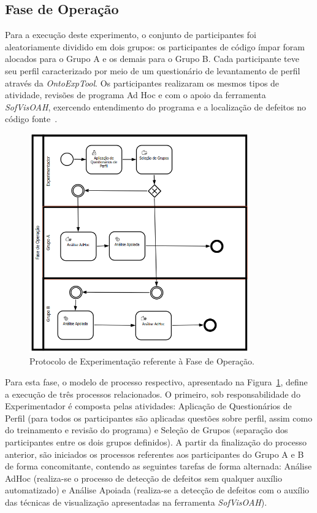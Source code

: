 \subsection{Fase de Operação}
Para a execução deste experimento, o conjunto de participantes foi aleatoriamente dividido em dois grupos: os participantes de código ímpar foram alocados para o Grupo A e os demais para o Grupo B. Cada participante teve seu perfil caracterizado por meio de um questionário de levantamento de perfil através da \textit{OntoExpTool}. Os participantes realizaram os mesmos tipos de atividade, revisões de programa Ad Hoc e com o apoio da ferramenta \textit{SofVisOAH}, exercendo entendimento do programa e a localização de defeitos no código fonte~\cite{d2012avaliaccao}.

\begin{figure}[!htb]
\centering
\includegraphics[width=0.85\textwidth]{images/protocolo-operacao.png}
\caption{Protocolo de Experimentação referente à Fase de Operação.}
\label{img:protocolo-operacao}
\end{figure}

Para esta fase, o modelo de processo respectivo, apresentado na Figura~\ref{img:protocolo-operacao}, define a execução de três processos relacionados. O primeiro, sob responsabilidade do Experimentador é composta pelas atividades: Aplicação de Questionários de Perfil (para todos os participantes são aplicadas questões sobre perfil, assim como do treinamento e revisão do programa) e Seleção de Grupos (separação dos participantes entre os dois grupos definidos). A partir da finalização do processo anterior, são iniciados os processos referentes aos participantes do Grupo A e B de forma concomitante, contendo as seguintes tarefas de forma alternada: Análise AdHoc (realiza-se o processo de detecção de defeitos sem qualquer auxílio automatizado) e Análise Apoiada (realiza-se a detecção de defeitos com o auxílio das técnicas de visualização apresentadas na ferramenta \textit{SofVisOAH}).

